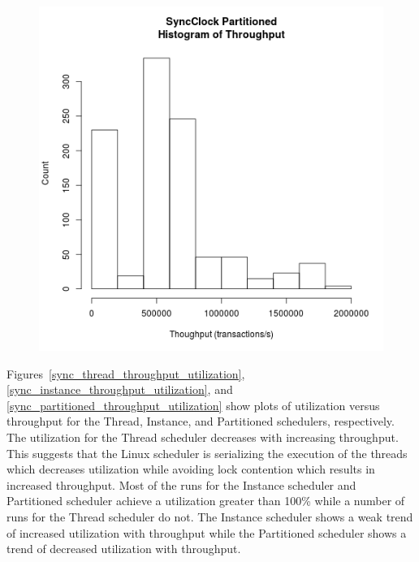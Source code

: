 \begin{figure}
\center
\includegraphics[height=.4\textheight]{sync_partitioned_throughput_hist.png}
\caption{\label{sync_partitioned_throughput}}
\end{figure}

Figures~\ref{sync_thread_throughput_utilization}, \ref{sync_instance_throughput_utilization}, and \ref{sync_partitioned_throughput_utilization} show plots of utilization versus throughput for the Thread, Instance, and Partitioned schedulers, respectively.
The utilization for the Thread scheduler decreases with increasing throughput.
This suggests that the Linux scheduler is serializing the execution of the threads which decreases utilization while avoiding lock contention which results in increased throughput.
Most of the runs for the Instance scheduler and Partitioned scheduler achieve a utilization greater than 100\% while a number of runs for the Thread scheduler do not.
The Instance scheduler shows a weak trend of increased utilization with throughput while the Partitioned scheduler shows a trend of decreased utilization with throughput.

